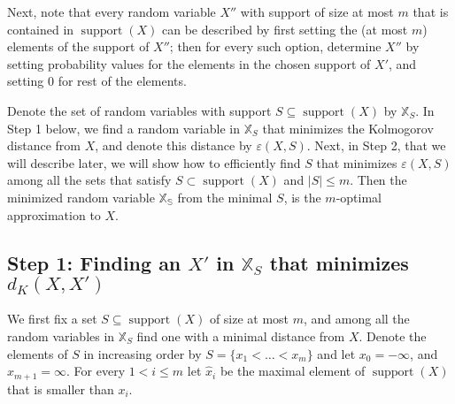 \documentclass{article}
\DeclareMathOperator{\support}{support}
\begin{document}


Next, note that every random variable $X''$ with support of size at most $m$ that is contained in $\support(X)$ can be described by first setting the (at most $m$) elements of the support of $X''$; then for every such option, determine $X''$ by setting probability values for the elements in the chosen support of $X'$, and setting $0$ for rest of the elements.

Denote the set of random variables with support $S \subseteq \support(X)$ by $\mathbb{X}_S$. In Step 1 below, we find a random variable in $\mathbb{X}_S$ that minimizes the Kolmogorov distance from $X$, and denote this distance by $\varepsilon(X,S)$. Next, in Step 2, that we will describe later, we will show how to efficiently find $S$ that minimizes $\varepsilon(X,S)$ among all the sets that satisfy $S \subset \support(X)$ and $|S| \leq m$. Then the minimized random variable $\mathbb{X_S}$ from the minimal $S$, is the $m$-optimal approximation to $X$.

\subsection*{Step 1: Finding an $X'$ in $\mathbb{X}_S$ that minimizes $d_K(X,X')$}


We first fix a set $S\subseteq \support(X)$ of size at most $m$, and among all the random variables in $\mathbb{X}_S$ find one with a minimal distance from $X$. Denote the elements of $S$ in increasing order by $S=\{x_1<\dots<x_m\}$ and let $x_0=-\infty$, and $x_{m+1}=\infty$. For every $1 <  i \leq m$ let $\hat x_i$ be the maximal element of $\support(X)$ that is smaller than $x_i$.
\end{document}
